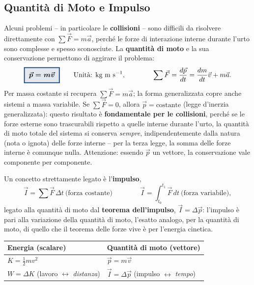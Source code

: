 \documentclass[a4paper,11pt]{article}
\newcommand{\keyeq}[1]{{\setlength{\fboxsep}{6pt}\setlength{\fboxrule}{1.3pt}\fcolorbox{chapblue}{chapblue!12}{\boldmath$\displaystyle #1$}}}
\begin{document}
\subsection{Quantità di Moto e Impulso}

Alcuni problemi -- in particolare le \textbf{collisioni} -- sono difficili da risolvere direttamente con $\sum\vec F=m\vec a$, perché le forze di interazione interne durante l'urto sono complesse e spesso sconosciute. La \textbf{quantità di moto} e la sua conservazione permettono di aggirare il problema:
\[
\keyeq{\vec p = m\vec v} \qquad \text{Unità: kg m s}^{-1}, \qquad\qquad \sum\vec F = \frac{d\vec p}{dt} = \frac{dm}{dt}\vec v + m\vec a.
\]
Per massa costante si recupera $\sum\vec F=m\vec a$; la forma generalizzata copre anche sistemi a massa variabile. Se $\sum\vec F=0$, allora $\vec p=\text{costante}$ (legge d'inerzia generalizzata): questo risultato è \textbf{fondamentale per le collisioni}, perché se le forze esterne sono trascurabili rispetto a quelle interne durante l'urto, la quantità di moto totale del sistema si conserva \emph{sempre}, indipendentemente dalla natura (nota o ignota) delle forze interne -- per la terza legge, la somma delle forze interne è comunque nulla. Attenzione: essendo $\vec p$ un vettore, la conservazione vale componente per componente.

Un concetto strettamente legato è l'\textbf{impulso},
\[
\vec I = \sum\vec F\,\Delta t\ \text{(forza costante)} \qquad\qquad \vec I = \int_{t_0}^{t_1}\vec F\,dt\ \text{(forza variabile)},
\]
legato alla quantità di moto dal \textbf{teorema dell'impulso}, $\vec I=\Delta\vec p$: l'impulso è pari alla variazione della quantità di moto, l'esatto analogo, per la quantità di moto, di quello che il teorema delle forze vive è per l'energia cinetica.

\begin{center}
\small
\begin{tabular}{ll}
\toprule
\textbf{Energia (scalare)} & \textbf{Quantità di moto (vettore)} \\
\midrule
$K=\frac12mv^2$ & $\vec p = m\vec v$ \\
$W=\Delta K$ (lavoro $\leftrightarrow$ \emph{distanza}) & $\vec I=\Delta\vec p$ (impulso $\leftrightarrow$ \emph{tempo}) \\
\bottomrule
\end{tabular}
\end{center}
\end{document}

